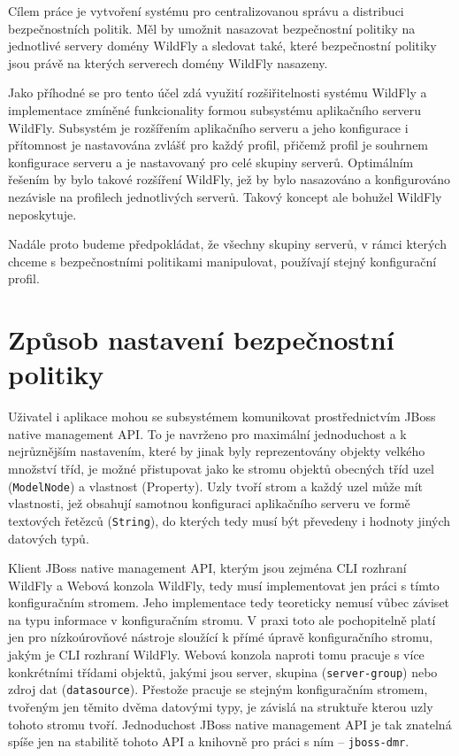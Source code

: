 Cílem práce je vytvoření systému pro centralizovanou správu a distribuci bezpečnostních politik. Měl by umožnit nasazovat bezpečnostní politiky na jednotlivé servery domény WildFly a sledovat také, které bezpečnostní politiky jsou právě na kterých serverech domény WildFly nasazeny.

Jako příhodné se pro tento účel zdá využití rozšiřitelnosti systému WildFly a implementace zmíněné funkcionality formou subsystému aplikačního serveru WildFly. Subsystém je rozšířením aplikačního serveru a jeho konfigurace i přítomnost je nastavována zvlášť pro každý profil, přičemž profil je souhrnem konfigurace serveru a je nastavovaný pro celé skupiny serverů. Optimálním řešením by bylo takové rozšíření WildFly, jež by bylo nasazováno a konfigurováno nezávisle na profilech jednotlivých serverů. Takový koncept ale bohužel WildFly neposkytuje.

Nadále proto budeme předpokládat, že všechny skupiny serverů, v rámci kterých chceme s bezpečnostními politikami manipulovat, používají stejný konfigurační profil.

\section{Způsob nastavení bezpečnostní politiky}

Uživatel i aplikace mohou se subsystémem komunikovat prostřednictvím JBoss native management API. To je navrženo pro maximální jednoduchost a k nejrůznějším nastavením, které by jinak byly reprezentovány objekty velkého množství tříd, je možné přistupovat jako ke stromu objektů obecných tříd uzel ({\tt ModelNode}) a vlastnost (Property). Uzly tvoří strom a každý uzel může mít vlastnosti, jež obsahují samotnou konfiguraci aplikačního serveru ve formě textových řetězců ({\tt String}), do kterých tedy musí být převedeny i hodnoty jiných datových typů. \cite{jbossDetypedManagement}

Klient JBoss native management API, kterým jsou zejména CLI rozhraní WildFly a Webová konzola WildFly, tedy musí implementovat jen práci s tímto konfiguračním stromem. Jeho implementace tedy teoreticky nemusí vůbec záviset na typu informace v konfiguračním stromu. V praxi toto ale pochopitelně platí jen pro nízkoúrovňové nástroje sloužící k přímé úpravě konfiguračního stromu, jakým je CLI rozhraní WildFly. Webová konzola naproti tomu pracuje s více konkrétními třídami objektů, jakými jsou server, skupina ({\tt server-group}) nebo zdroj dat ({\tt datasource}). Přestože pracuje se stejným konfiguračním stromem, tvořeným jen těmito dvěma datovými typy, je závislá na struktuře kterou uzly tohoto stromu tvoří. Jednoduchost JBoss native management API je tak znatelná spíše jen na stabilitě tohoto API a knihovně pro práci s ním -- {\tt jboss-dmr}. \cite{jbossDetypedManagement}

